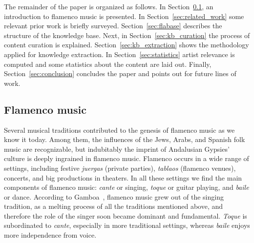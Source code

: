 The remainder of the paper is organized as follows. In Section~\ref{sec:flamenco}, an introduction to flamenco music is presented. In Section~\ref{sec:related_work}  some relevant prior work is briefly surveyed. Section~\ref{sec:flabase} describes the structure of the knowledge base. Next, in Section~\ref{sec:kb_curation} the process of content curation is explained. Section~\ref{sec:kb_extraction} shows the methodology applied for knowledge extraction. In Section~\ref{sec:statistics} artist relevance is computed and some statistics about the content are laid out. Finally, Section~\ref{sec:conclusion} concludes the paper and points out for future lines of work.


\subsection{Flamenco music}\label{sec:flamenco}


Several musical traditions contributed to the genesis of flamenco music as we know it today. Among them, the influences of the Jews, Arabs, and Spanish folk music are recognizable, but indubitably  the imprint of  Andalusian Gypsies' culture is deeply ingrained in flamenco music. 
Flamenco occurs in a wide range of settings, including festive \textit{juergas} (private parties), \textit{tablaos} (flamenco venues), concerts, and big productions in theaters. In all these settings we find the main components of flamenco music: \textit{cante} or singing, \textit{toque} or guitar playing, and \textit{baile} or dance. According to Gamboa~\cite{gamboa-05}, flamenco music grew out of the singing tradition, as a melting process of all the traditions mentioned above, and therefore the role of the singer soon became dominant and fundamental. \textit{Toque}  is subordinated to \textit{cante}, especially in more traditional settings, whereas \textit{baile} enjoys more independence from voice. 


